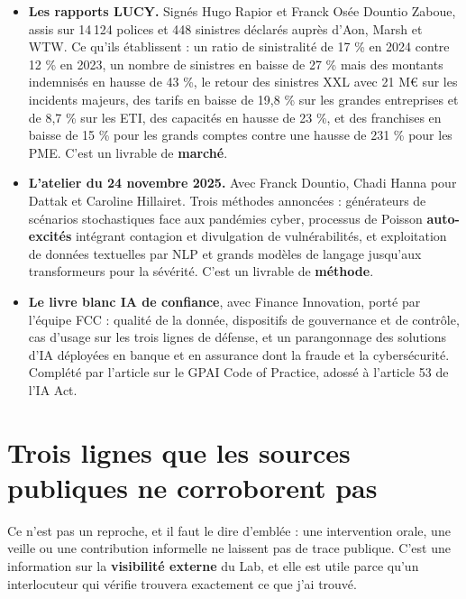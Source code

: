 \documentclass[11pt,a4paper]{article}
\begin{document}
\begin{itemize}
\item \textbf{Les rapports LUCY.} Signés Hugo Rapior et Franck Osée Dountio Zaboue, assis sur
      14\,124 polices et 448 sinistres déclarés auprès d'Aon, Marsh et WTW. Ce qu'ils
      établissent : un ratio de sinistralité de 17 \% en 2024 contre 12 \% en 2023, un nombre de
      sinistres en baisse de 27 \% mais des montants indemnisés en hausse de 43 \%, le retour des
      sinistres XXL avec 21 M\euro{} sur les incidents majeurs, des tarifs en baisse de 19,8 \%
      sur les grandes entreprises et de 8,7 \% sur les ETI, des capacités en hausse de 23 \%, et
      des franchises en baisse de 15 \% pour les grands comptes contre une hausse de 231 \% pour
      les PME. C'est un livrable de \textbf{marché}.
\item \textbf{L'atelier du 24 novembre 2025.} Avec Franck Dountio, Chadi Hanna pour Dattak et
      Caroline Hillairet. Trois méthodes annoncées : générateurs de scénarios stochastiques face
      aux pandémies cyber, processus de Poisson \textbf{auto-excités} intégrant contagion et
      divulgation de vulnérabilités, et exploitation de données textuelles par NLP et grands
      modèles de langage jusqu'aux transformeurs pour la sévérité. C'est un livrable de
      \textbf{méthode}.
\item \textbf{Le livre blanc IA de confiance}, avec Finance Innovation, porté par l'équipe FCC :
      qualité de la donnée, dispositifs de gouvernance et de contrôle, cas d'usage sur les trois
      lignes de défense, et un parangonnage des solutions d'IA déployées en banque et en
      assurance dont la fraude et la cybersécurité. Complété par l'article sur le GPAI Code of
      Practice, adossé à l'article 53 de l'IA Act.
\end{itemize}

\section{Trois lignes que les sources publiques ne corroborent pas}

Ce n'est pas un reproche, et il faut le dire d'emblée : une intervention orale, une veille ou
une contribution informelle ne laissent pas de trace publique. C'est une information sur la
\textbf{visibilité externe} du Lab, et elle est utile parce qu'un interlocuteur qui vérifie
trouvera exactement ce que j'ai trouvé.
\end{document}
